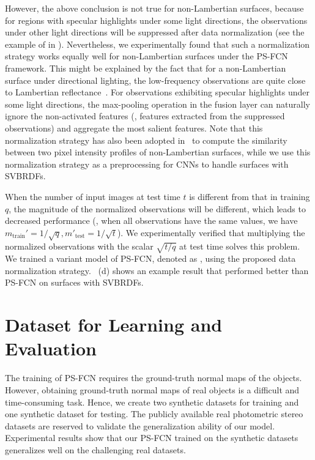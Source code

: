 However, the above conclusion is not true for non-Lambertian surfaces, because for regions with specular highlights under some light directions, the observations under other light directions will be suppressed after data normalization (see the example of  in ).
Nevertheless, we experimentally found that such a normalization strategy works equally well for non-Lambertian surfaces under the PS-FCN framework.
This might be explained by the fact that for a non-Lambertian surface under directional lighting, the low-frequency observations are quite close to Lambertian reflectance~\cite{shi2014bi}.
For observations exhibiting specular highlights under some light directions, the max-pooling operation in the fusion layer can naturally ignore the non-activated features (\ie, features extracted from the suppressed observations) and aggregate the most salient features.  
Note that this normalization strategy has also been adopted in~\cite{sato2007shape,lu2013uncalibrated} to compute the similarity between two pixel intensity profiles of non-Lambertian surfaces, while we use this normalization strategy as a preprocessing for CNNs to handle surfaces with SVBRDFs.  

When the number of input images at test time $t$ is different from that in training $q$, the magnitude of the normalized observations will be different, which leads to decreased performance (\eg, when all observations have the same values, 
we have $m_{\text{train}}' = 1/\sqrt{q}, m'_{\text{test}}=1/\sqrt{t}$). 
We experimentally verified that multiplying the normalized observations with the scalar $\sqrt{t/q}$ at test time solves this problem.
We trained a variant model of PS-FCN, denoted as \PSFCNplusN, using the proposed data normalization strategy.
~(d) shows an example result that \PSFCNplusN performed better than PS-FCN on surfaces with SVBRDFs.

\section{Dataset for Learning and Evaluation}
\label{sec:psfcn_dataset}
The training of PS-FCN requires the ground-truth normal maps of the objects. However, obtaining ground-truth normal maps of real objects is a difficult and time-consuming task. Hence, we create two synthetic datasets for training and one synthetic dataset for testing. The publicly available real photometric stereo datasets are reserved to validate the generalization ability of our model. Experimental results show that our PS-FCN trained on the synthetic datasets generalizes well on the challenging real datasets.

